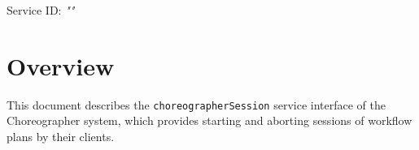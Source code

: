 \documentclass[a4paper]{arrowhead}
\begin{document}
\sloppy

\ArrowheadSetup

\begin{center}
  \vspace*{1cm}
  \huge{\arrowtitle}

  \vspace*{0.2cm}
  \LARGE{\arrowtype}
  \vspace*{1cm}

  \Large{Service ID: \textit{"\arrowid"}}

  \vspace*{\fill}


  \vspace*{1cm}
  \vspace*{\fill}

  \begin{abstract}
    This document describes the HTTP/1.1 protocol with TLS payload security and JSON payload encoding variant of the \texttt{choreographer\allowbreak{}Session} service of the Choreographer system.
  \end{abstract}

  \vspace*{1cm}
\end{center}

\newpage

\tableofcontents
\newpage

\section{Overview}
\label{sec:overview}

This document describes the \texttt{choreographer\allowbreak{}Session} service interface of the Choreographer system, which provides starting and aborting sessions of workflow plans by their clients.
\end{document}
